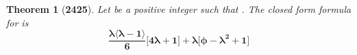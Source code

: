 \documentclass[preview]{standalone}
\newtheorem*{theorem*}{Theorem}
\begin{document}
\begin{theorem*}[\textbf{2425}]
    Let \bm{$\phi$} be a positive integer such that
    \bm{$\lfloor \sqrt \phi \rfloor = \lambda$}.
    The closed form formula for 
    is 
    \begin{equation*}
        \bm{
            \frac{
                \lambda
                \big \langle \lambda - 1 \big \rangle
            }
            {6}
            \Bigg[
                4 \lambda + 1
            \Bigg]
                +
            \lambda
            \Bigg[
                \phi
                    -
                \lambda ^2
                    +
                1
            \Bigg]
        }
    \end{equation*}
\end{theorem*}
\end{document}
